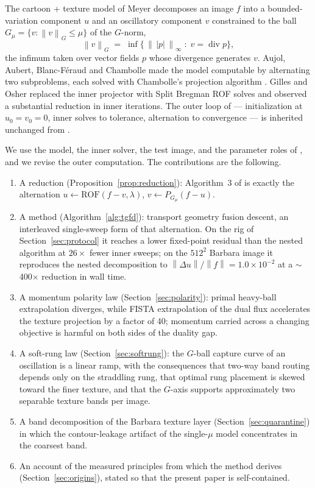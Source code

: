 \documentclass[11pt]{article}
\theoremstyle{definition}
\newcommand{\norm}[1]{\left\lVert #1 \right\rVert}
\newcommand{\ROF}{\mathrm{ROF}}
\newcommand{\PG}{P_{G_\mu}}
\newcommand{\dv}{\operatorname{div}}
\begin{document}
The cartoon + texture model of Meyer \cite{meyer} decomposes an image $f$
into a bounded-variation component $u$ and an oscillatory component $v$
constrained to the ball $G_\mu=\{v:\norm{v}_G\le\mu\}$ of the $G$-norm,
\begin{equation}
\norm{v}_G \;=\; \inf\bigl\{\,\norm{\,|p|\,}_\infty \;:\; v=\dv p \bigr\},
\label{eq:gnorm}
\end{equation}
the infimum taken over vector fields $p$ whose divergence generates $v$.
Aujol, Aubert, Blanc-F\'eraud and Chambolle \cite{aujol} made the model
computable by alternating two subproblems, each solved with Chambolle's
projection algorithm \cite{chambolle}. Gilles and Osher \cite{gilles}
replaced the inner projector with Split Bregman ROF solves \cite{goldstein}
and observed a substantial reduction in inner iterations. The outer loop of
\cite{gilles} --- initialization at $u_0=v_0=0$, inner solves to tolerance,
alternation to convergence --- is inherited unchanged from \cite{aujol}.

We use the model, the inner solver, the test image, and the parameter roles
of \cite{gilles}, and we revise the outer computation. The contributions
are the following.

\begin{enumerate}
\item A reduction (Proposition~\ref{prop:reduction}): Algorithm~3 of
\cite{gilles} is exactly the alternation
$u\leftarrow\ROF(f-v,\lambda)$, $v\leftarrow\PG(f-u)$.
\item A method (Algorithm~\ref{alg:tgfd}): transport geometry fusion
descent, an interleaved single-sweep form of that alternation. On the rig
of Section~\ref{sec:protocol} it reaches a lower fixed-point residual than
the nested algorithm at $26\times$ fewer inner sweeps; on the $512^2$
Barbara image it reproduces the nested decomposition to
$\norm{\Delta u}/\norm{f}=1.0\times10^{-2}$ at a $\sim$400$\times$
reduction in wall time.
\item A momentum polarity law (Section~\ref{sec:polarity}): primal
heavy-ball extrapolation diverges, while FISTA extrapolation of the dual
flux accelerates the texture projection by a factor of 40; momentum carried
across a changing objective is harmful on both sides of the duality gap.
\item A soft-rung law (Section~\ref{sec:softrung}): the $G$-ball capture
curve of an oscillation is a linear ramp, with the consequences that
two-way band routing depends only on the straddling rung, that optimal rung
placement is skewed toward the finer texture, and that the $G$-axis
supports approximately two separable texture bands per image.
\item A band decomposition of the Barbara texture layer
(Section~\ref{sec:quarantine}) in which the contour-leakage artifact of the
single-$\mu$ model concentrates in the coarsest band.
\item An account of the measured principles from which the method derives
(Section~\ref{sec:origins}), stated so that the present paper is
self-contained.
\end{enumerate}
\end{document}
